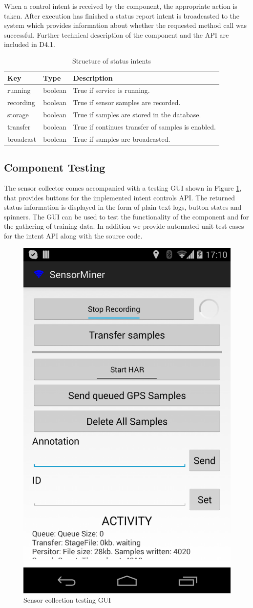 When a control intent is received by the component, the appropriate
action is taken. After execution has finished a status report intent
is broadcasted to the system which provides information about whether
the requested method call was successful. Further technical
description of the component and the API are included in D4.1.

\begin{table}[ht]
\centering
\begin{tabular}{|l|l|l|} \hline
   Key       & Type    & Description                                       \\ \hline
   running   & boolean & True if service is running.                       \\
   recording & boolean & True if sensor samples are recorded.              \\
   storage   & boolean & True if samples are stored in the database.       \\
   transfer  & boolean & True if continues transfer of samples is enabled. \\
   broadcast & boolean & True if samples are broadcasted.                  \\ \hline
\end{tabular}
\caption{Structure of status intents}
\label{tab:StatusIntent}
\end{table}

\subsection*{Component Testing}

The sensor collector comes accompanied with a testing GUI shown in
Figure \ref{fig:sc_gui}, that provides buttons for the implemented
intent controls API. The returned status information is displayed in
the form of plain text logs, button states and spinners.  The GUI can
be used to test the functionality of the component and for the
gathering of training data.  In addition we provide automated
unit-test cases for the intent API along with the source code.

\begin{figure}[h]
\centering
\includegraphics[width=0.3 \textwidth]{img/sc/sc_gui.png}
\caption{Sensor collection testing GUI}\label{fig:sc_gui}
\end{figure}

